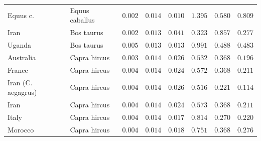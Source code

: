 \documentclass[12pt]{article}
\begin{document}
\begin{center}
\begin{longtable*}{|l|l|r|r|r|r|r|r|}
            \bottomrule
            \endlastfoot
             Equus c. &      Equus caballus &               $ 0.002$ &              $ 0.014$ &              $ 0.010$ &                                          $ 1.395$ &                         $ 0.580$ &                      $ 0.809$ \\
            Iran &          Bos taurus &               $ 0.002$ &              $ 0.013$ &              $ 0.041$ &                                          $ 0.323$ &                         $ 0.857$ &                      $ 0.277$ \\
            Uganda &          Bos taurus &               $ 0.005$ &              $ 0.013$ &              $ 0.013$ &                                          $ 0.991$ &                         $ 0.488$ &                      $ 0.483$ \\
             Australia &        Capra hircus &               $ 0.003$ &              $ 0.014$ &              $ 0.026$ &                                          $ 0.532$ &                         $ 0.368$ &                      $ 0.196$ \\
             France &        Capra hircus &               $ 0.004$ &              $ 0.014$ &              $ 0.024$ &                                          $ 0.572$ &                         $ 0.368$ &                      $ 0.211$ \\
             Iran (C. aegagrus) &        Capra hircus &               $ 0.004$ &              $ 0.014$ &              $ 0.026$ &                                          $ 0.516$ &                         $ 0.221$ &                      $ 0.114$ \\
             Iran &        Capra hircus &               $ 0.004$ &              $ 0.014$ &              $ 0.024$ &                                          $ 0.573$ &                         $ 0.368$ &                      $ 0.211$ \\
             Italy &        Capra hircus &               $ 0.004$ &              $ 0.014$ &              $ 0.017$ &                                          $ 0.814$ &                         $ 0.270$ &                      $ 0.220$ \\
             Morocco &        Capra hircus &               $ 0.004$ &              $ 0.014$ &              $ 0.018$ &                                          $ 0.751$ &                         $ 0.368$ &                      $ 0.276$ \\

\end{longtable*}
\end{center}
\end{document}
